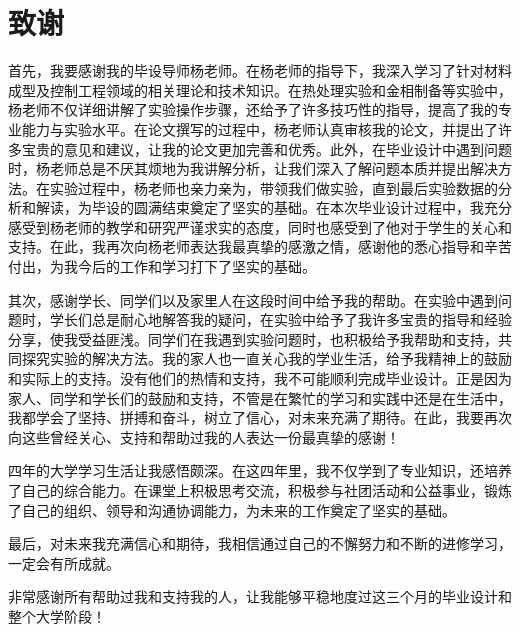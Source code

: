\chapter{致谢}

首先，我要感谢我的毕设导师杨老师。在杨老师的指导下，我深入学习了针对材料成型及控制工程领域的相关理论和技术知识。在热处理实验和金相制备等实验中，杨老师不仅详细讲解了实验操作步骤，还给予了许多技巧性的指导，提高了我的专业能力与实验水平。在论文撰写的过程中，杨老师认真审核我的论文，并提出了许多宝贵的意见和建议，让我的论文更加完善和优秀。此外，在毕业设计中遇到问题时，杨老师总是不厌其烦地为我讲解分析，让我们深入了解问题本质并提出解决方法。在实验过程中，杨老师也亲力亲为，带领我们做实验，直到最后实验数据的分析和解读，为毕设的圆满结束奠定了坚实的基础。在本次毕业设计过程中，我充分感受到杨老师的教学和研究严谨求实的态度，同时也感受到了他对于学生的关心和支持。在此，我再次向杨老师表达我最真挚的感激之情，感谢他的悉心指导和辛苦付出，为我今后的工作和学习打下了坚实的基础。

其次，感谢学长、同学们以及家里人在这段时间中给予我的帮助。在实验中遇到问题时，学长们总是耐心地解答我的疑问，在实验中给予了我许多宝贵的指导和经验分享，使我受益匪浅。同学们在我遇到实验问题时，也积极给予我帮助和支持，共同探究实验的解决方法。我的家人也一直关心我的学业生活，给予我精神上的鼓励和实际上的支持。没有他们的热情和支持，我不可能顺利完成毕业设计。正是因为家人、同学和学长们的鼓励和支持，不管是在繁忙的学习和实践中还是在生活中，我都学会了坚持、拼搏和奋斗，树立了信心，对未来充满了期待。在此，我要再次向这些曾经关心、支持和帮助过我的人表达一份最真挚的感谢！

四年的大学学习生活让我感悟颇深。在这四年里，我不仅学到了专业知识，还培养了自己的综合能力。在课堂上积极思考交流，积极参与社团活动和公益事业，锻炼了自己的组织、领导和沟通协调能力，为未来的工作奠定了坚实的基础。

最后，对未来我充满信心和期待，我相信通过自己的不懈努力和不断的进修学习，一定会有所成就。

非常感谢所有帮助过我和支持我的人，让我能够平稳地度过这三个月的毕业设计和整个大学阶段！